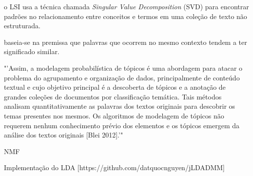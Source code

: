 



o LSI usa a técnica chamada \textit{Singular Value Decomposition} (SVD) para encontrar padrões no relacionamento entre conceitos e termos em uma coleção de texto não estruturada.

baseia-se na premissa que palavras que ocorrem no mesmo contexto tendem a ter significado similar.




"'Assim, a modelagem probabilística de tópicos é uma abordagem para atacar o problema do agrupamento e organização de dados, principalmente de conteúdo textual e cujo objetivo principal é a descoberta de tópicos e a anotação de grandes coleções de documentos por classificação temática. Tais métodos analisam quantitativamente as palavras dos textos originais para descobrir os temas presentes nos mesmos. Os algoritmos de modelagem de tópicos não requerem nenhum conhecimento prévio dos elementos e os tópicos emergem da análise dos textos originais [Blei 2012].'"













NMF




Implementação do LDA
[https://github.com/datquocnguyen/jLDADMM]
